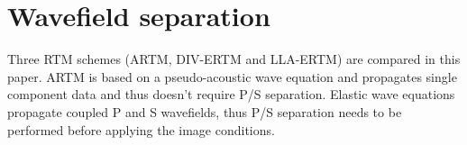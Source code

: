 \documentclass[manuscript,ulem,graphix,revised]{geophysics}
\begin{document}
\section{Wavefield separation} 
\indent\indent
Three RTM schemes (ARTM, DIV-ERTM and LLA-ERTM) are compared in this paper. ARTM is based on a pseudo-acoustic wave equation and propagates single component data and thus doesn't require P/S separation. Elastic wave equations propagate coupled P and S wavefields, thus P/S separation needs to be performed before applying the image conditions. 
\end{document}
